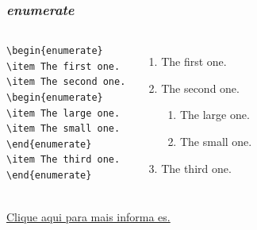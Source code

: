 \documentclass{article}
\begin{document}
\begin{frame}[fragile]
\frametitle{\emph{enumerate}}

\begin{columns}
\begin{block}
\scriptsize{
\begin{verbatim}
\begin{enumerate}
\item The first one.
\item The second one.
\begin{enumerate}
\item The large one.
\item The small one.
\end{enumerate}
\item The third one.
\end{enumerate}
\end{verbatim}
}
\end{block}

\begin{enumerate}
\item The first one.
\item The second one.
\begin{enumerate}
\item The large one.
\item The small one.
\end{enumerate}
\item The third one.
\end{enumerate}
\end{columns}
\vspace{1.5cm}
\href{https://tug.ctan.org/macros/latex/contrib/beamer/doc/beameruserguide.pdf}{Clique aqui para mais informa es.}

\end{frame}
\end{document}
